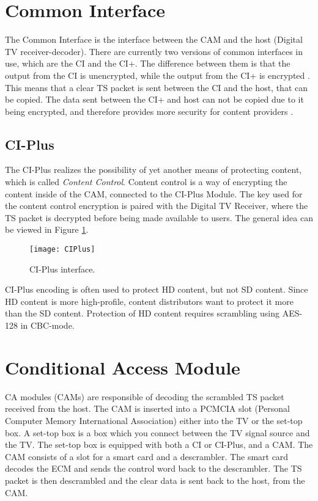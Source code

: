 \section{Common Interface} \label{sec:CI}
The Common Interface is the interface between the CAM and the host 
(Digital TV receiver-decoder). There are currently two versions of 
common interfaces in use, which are the CI and the CI+. The difference 
between them is that the output from the CI is unencrypted, while the 
output from the CI+ is encrypted \citep{CI+:2011}. This means that a 
clear TS packet is sent between the CI and the host, that can be 
copied. The data sent between the CI+ and host can not be copied due 
to it being encrypted, and therefore provides more security for 
content providers \citep{CI:1997}.

\subsection{CI-Plus}
The CI-Plus realizes the possibility of yet another means of protecting 
content, which is called \emph{Content Control}. Content control is a 
way of encrypting the content inside of the CAM, connected to the 
CI-Plus Module. The key used for the content control encryption is 
paired with the Digital TV Receiver, where the TS packet is decrypted 
before being made available to users. The general idea can be viewed 
in Figure \ref{img:CIPlus}.

\begin{figure}[h!]
  \centering
  \texttt{[image: CIPlus]}
  \caption{CI-Plus interface. \citep[p. 10]{CI+:2011}}
  \label{img:CIPlus}
\end{figure}

CI-Plus encoding is often used to protect HD content, but not SD 
content. Since HD content is more high-profile, content distributors 
want to protect it more than the SD content. Protection of HD content 
requires scrambling using AES-128 in CBC-mode. 
\citep{CI+:2011, CI+:2011_2}

\section{Conditional Access Module}\label{sec:CAM}
CA modules (CAMs) are responsible of decoding the scrambled TS packet
received from the host. The CAM is inserted into a PCMCIA slot 
(Personal Computer Memory International Association) either into the TV 
or the set-top box. A set-top box is a box which you connect between 
the TV signal source and the TV. The set-top box is equipped with both 
a CI or CI-Plus, and a CAM. The CAM consists of a slot for a 
smart card and a descrambler. The smart card decodes the ECM and sends 
the control word back to the descrambler. The TS packet is then 
descrambled and the clear data is sent back to the host, from the CAM.
